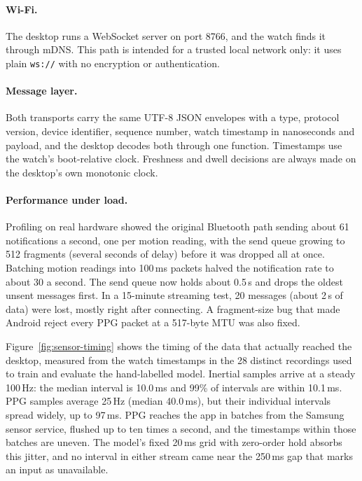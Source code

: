 \paragraph{Wi-Fi.} The desktop runs a WebSocket server on port 8766, and the watch finds it through mDNS. This path is intended for a trusted local network only: it uses plain \texttt{ws://} with no encryption or authentication.

\paragraph{Message layer.} Both transports carry the same UTF-8 JSON envelopes with a type, protocol version, device identifier, sequence number, watch timestamp in nanoseconds and payload, and the desktop decodes both through one function. Timestamps use the watch's boot-relative clock. Freshness and dwell decisions are always made on the desktop's own monotonic clock.

\paragraph{Performance under load.} Profiling on real hardware showed the original Bluetooth path sending about 61 notifications a second, one per motion reading, with the send queue growing to 512 fragments (several seconds of delay) before it was dropped all at once. Batching motion readings into 100\,ms packets halved the notification rate to about 30 a second. The send queue now holds about 0.5\,s and drops the oldest unsent messages first. In a 15-minute streaming test, 20 messages (about 2\,s of data) were lost, mostly right after connecting. A fragment-size bug that made Android reject every PPG packet at a 517-byte MTU was also fixed.

Figure~\ref{fig:sensor-timing} shows the timing of the data that actually reached the desktop, measured from the watch timestamps in the 28 distinct recordings used to train and evaluate the hand-labelled model. Inertial samples arrive at a steady 100\,Hz: the median interval is 10.0\,ms and 99\% of intervals are within 10.1\,ms. PPG samples average 25\,Hz (median 40.0\,ms), but their individual intervals spread widely, up to 97\,ms. PPG reaches the app in batches from the Samsung sensor service, flushed up to ten times a second, and the timestamps within those batches are uneven. The model's fixed 20\,ms grid with zero-order hold absorbs this jitter, and no interval in either stream came near the 250\,ms gap that marks an input as unavailable.

